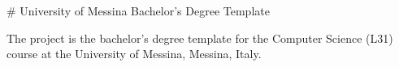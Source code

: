 # University of Messina Bachelor's Degree Template

The project is the bachelor's degree template for the Computer Science (L31) course at the University of Messina, Messina, Italy.